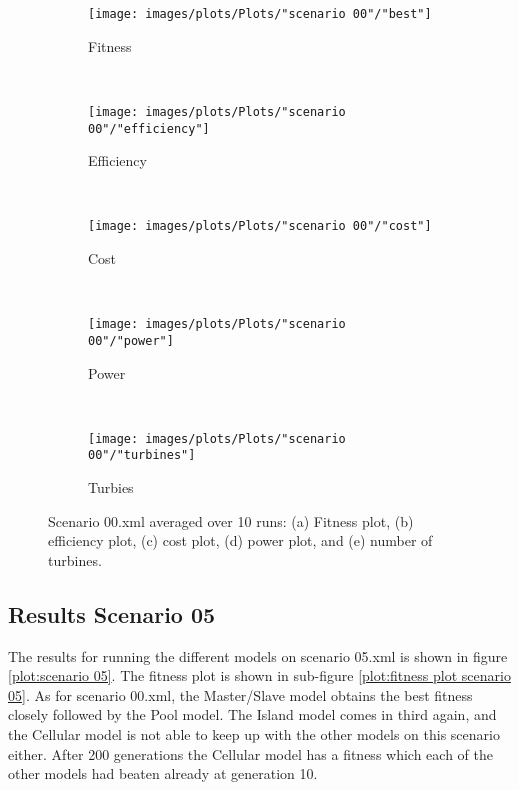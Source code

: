 \begin{figure}[h!]
    \centering
      \begin{subfigure}[b]{0.45\textwidth}
        \texttt{[image: images/plots/Plots/"scenario 00"/"best"]}
        \caption{Fitness}
        \hfill
        \label{plot:fitness plot scenario 00}
    \end{subfigure}
    ~
      \begin{subfigure}[b]{0.45\textwidth}
        \texttt{[image: images/plots/Plots/"scenario 00"/"efficiency"]}
        \caption{Efficiency}
        \hfill
        \label{plot:efficiency plot scenario 00}
    \end{subfigure}
    ~
    \begin{subfigure}[b]{0.45\textwidth}
        \texttt{[image: images/plots/Plots/"scenario 00"/"cost"]}
        \caption{Cost}
        \hfill
        \label{plot:cost plot scenario 00}
    \end{subfigure}
    ~
    \begin{subfigure}[b]{0.45\textwidth}
        \texttt{[image: images/plots/Plots/"scenario 00"/"power"]}
        \caption{Power}
        \hfill
        \label{plot:power plot scenario 00}
    \end{subfigure}
    ~
    \begin{subfigure}[b]{0.45\textwidth}
        \texttt{[image: images/plots/Plots/"scenario 00"/"turbines"]}
        \caption{Turbies}
        \hfill
        \label{plot:turbines plot scenario 00}
    \end{subfigure}
    \caption{Scenario 00.xml averaged over 10 runs: (a) Fitness plot, (b) efficiency plot, (c) cost plot, (d) power plot, and (e) number of turbines.}
    \label{plot:scenario 00}
\end{figure}


\subsection{Results Scenario 05}
The results for running the different models on scenario 05.xml is shown in figure \ref{plot:scenario 05}. The fitness plot is shown in sub-figure \ref{plot:fitness plot scenario 05}. As for scenario 00.xml, the Master/Slave model obtains the best fitness closely followed by the Pool model. The Island model comes in third again, and the Cellular model is not able to keep up with the other models on this scenario either. After 200 generations the Cellular model has a fitness which each of the other models had beaten already at generation 10.\\


